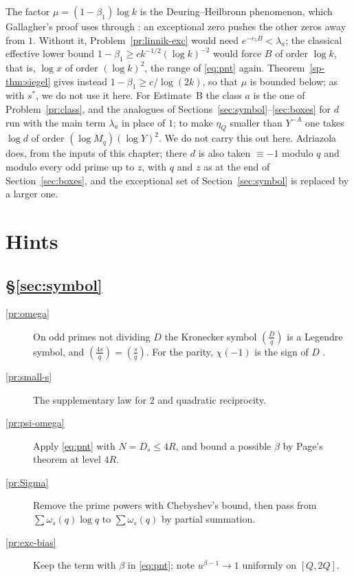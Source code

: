 \documentclass[reqno]{amsart}
\newcounter{chap}
\theoremstyle{definition}
\theoremstyle{plain}
\begin{document}
The factor $\mu = (1 - \beta_1)\log k$ is the Deuring--Heilbronn phenomenon, which Gallagher's proof uses through \cite[(27)]{Gal}: an exceptional zero pushes the other zeros away from $1$.  Without it, Problem~\ref{pr:linnik-exc} would need $e^{-c_5 B} < \lambda_a$; the classical effective lower bound $1 - \beta_1 \ge c k^{-1/2} (\log k)^{-2}$ \cite[Ch.~14]{Dav} would force $B$ of order $\log k$, that is, $\log x$ of order $(\log k)^2$, the range of \eqref{eq:pnt} again.  Theorem~\ref{sp-thm:siegel} gives instead $1 - \beta_1 \ge c/\log(2k)$, so that $\mu$ is bounded below; as with $s^*$, we do not use it here.  For Estimate~B the class $a$ is the one of Problem~\ref{pr:class}, and the analogues of Sections~\ref{sec:symbol}--\ref{sec:boxes} for $d$ run with the main term $\lambda_a$ in place of $1$; to make $\eta_Q$ smaller than $Y^{-A}$ one takes $\log d$ of order $(\log M_q)(\log Y)^2$.  We do not carry this out here.  Adriazola \cite[\S5]{Adr} does, from the inputs of this chapter; there $d$ is also taken $\equiv -1$ modulo $q$ and modulo every odd prime up to $z$, with $q$ and $z$ as at the end of Section~\ref{sec:boxes}, and the exceptional set of Section~\ref{sec:symbol} is replaced by a larger one.


\section*{Hints}

\subsection*{\S\ref{sec:symbol}}
\begin{description}
\item[\ref{pr:omega}] On odd primes not dividing $D$ the Kronecker symbol $(\frac Dq)$ is a Legendre symbol, and $(\frac{4s}{q}) = (\frac sq)$.  For the parity, $\chi(-1)$ is the sign of $D$ \cite[Ch.~5]{Dav}.
\item[\ref{pr:small-s}] The supplementary law for $2$ and quadratic reciprocity.
\item[\ref{pr:psi-omega}] Apply \eqref{eq:pnt} with $N = D_s \le 4R$, and bound a possible $\beta$ by Page's theorem at level $4R$.
\item[\ref{pr:Sigma}] Remove the prime powers with Chebyshev's bound, then pass from $\sum \omega_s(q)\log q$ to $\sum \omega_s(q)$ by partial summation.
\item[\ref{pr:exc-bias}] Keep the term with $\beta$ in \eqref{eq:pnt}; note $u^{\beta - 1} \to 1$ uniformly on $[Q, 2Q]$.
\end{description}
\end{document}

